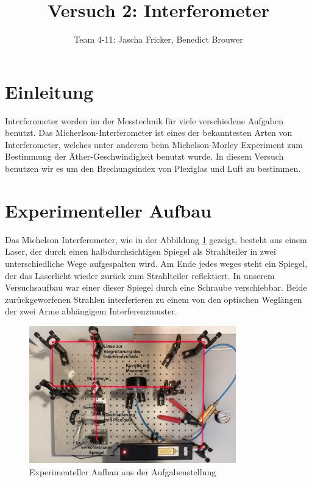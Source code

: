 \documentclass[11pt, a4paper]{article}
\title{Versuch 2: Interferometer}
\author{Team 4-11: Jascha Fricker, Benedict Brouwer}
\begin{document}
    \maketitle

    \tableofcontents

    \newpage

    \section{Einleitung}

    Interferometer werden im der Messtechnik für viele verschiedene Aufgaben benutzt. Das Micherlson-Interferometer ist eines der bekanntesten Arten von Interferometer, welches unter anderem beim Michelson-Morley Experiment zum Bestimmung der Äther-Geschwindigkeit benutzt wurde. In diesem Versuch benutzen wir es um den Brechungsindex von Plexiglas und Luft zu bestimmen.

    \section{Experimenteller Aufbau}

    Das Michelson Interferometer, wie in der Abbildung \ref{fig:auf} gezeigt, besteht aus einem Laser, der durch einen halbdurchsichtigen Spiegel als Strahlteiler in zwei unterschiedliche Wege aufgespalten wird. Am Ende jedes weges steht ein Spiegel, der das Laserlicht wieder zurück zum Strahlteiler reflektiert. In unserem Versuchsaufbau war einer dieser Spiegel durch eine Schraube verschiebbar. Beide zurückgeworfenen Strahlen interferieren zu einem von den optischen Weglängen der zwei Arme abhängigem Interferenzmuster.

    \begin{figure}
        \centering
        \includegraphics[width=0.8\textwidth]{Screenshot 2023-03-13 5.35.50 PM.png}
        \caption{Experimenteller Aufbau aus der Aufgabenstellung \cite{intauf}}
        \label{fig:auf}
    \end{figure}
\end{document}
